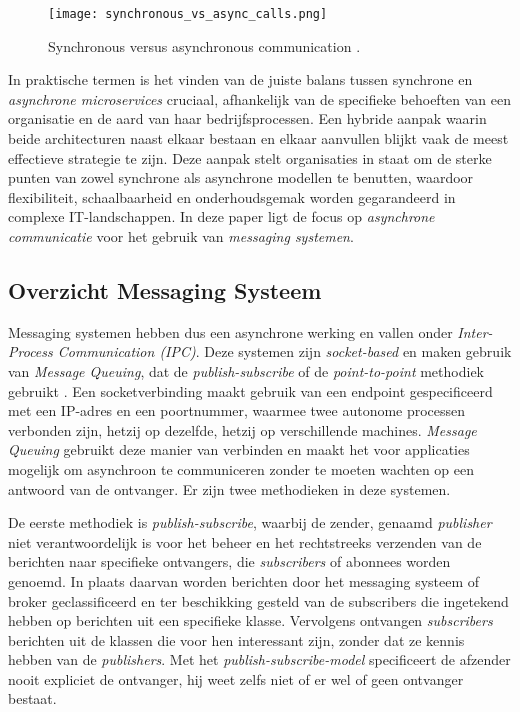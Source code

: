 \begin{figure}[H]
  \centering
  \texttt{[image: synchronous\_vs\_async\_calls.png]}
  \caption{\label{fig:img}Synchronous versus asynchronous communication \autocite[figure 14 -- 13]{MarkRichards2021}.}
\end{figure}

In praktische termen is het vinden van de juiste balans tussen synchrone en \emph{asynchrone microservices} cruciaal, 
afhankelijk van de specifieke behoeften van een organisatie en de aard van haar bedrijfsprocessen. 
Een hybride aanpak waarin beide architecturen naast elkaar bestaan en elkaar aanvullen blijkt vaak de meest effectieve strategie te zijn. 
Deze aanpak stelt organisaties in staat om de sterke punten van zowel synchrone als asynchrone modellen te benutten, 
waardoor flexibiliteit, schaalbaarheid en onderhoudsgemak worden gegarandeerd in complexe \newline IT-landschappen.
In deze paper ligt de focus op \emph{asynchrone communicatie} voor het gebruik van \emph{messaging systemen}.
\newline

\subsection{Overzicht Messaging Systeem}
Messaging systemen hebben dus een asynchrone werking en vallen onder \newline \emph{Inter-Process Communication (IPC)}. 
Deze systemen zijn \emph{socket-based} en maken gebruik van \emph{Message Queuing}, dat de \emph{publish-subscribe} of de \emph{point-to-point} methodiek gebruikt \autocite{Dinari2020}. 
\newline
Een socketverbinding maakt gebruik van een endpoint gespecificeerd met een IP-adres en een \newline poortnummer, 
waarmee twee autonome processen verbonden zijn, hetzij op dezelfde, hetzij op verschillende machines.
\newline
\emph{Message Queuing} gebruikt deze manier van verbinden en maakt het voor applicaties mogelijk om asynchroon 
te communiceren zonder te moeten wachten op een antwoord van de ontvanger. 
Er zijn twee methodieken in deze systemen. 
\newline

De eerste methodiek is \emph{publish-subscribe}, waarbij de zender, genaamd \emph{publisher} niet verantwoordelijk is voor het beheer 
en het rechtstreeks verzenden van de berichten naar specifieke ontvangers, die \emph{subscribers} of abonnees worden genoemd. 
In plaats daarvan worden berichten door het messaging systeem of broker geclassificeerd en ter 
beschikking gesteld van de subscribers die ingetekend hebben op berichten uit een specifieke klasse.
Vervolgens ontvangen \emph{subscribers} berichten uit de klassen die voor hen interessant zijn, zonder dat ze kennis hebben van de \emph{publishers}.
Met het \emph{publish-subscribe-model} specificeert de afzender nooit expliciet de ontvanger,
hij weet zelfs niet of er wel of geen ontvanger bestaat.
\newline

